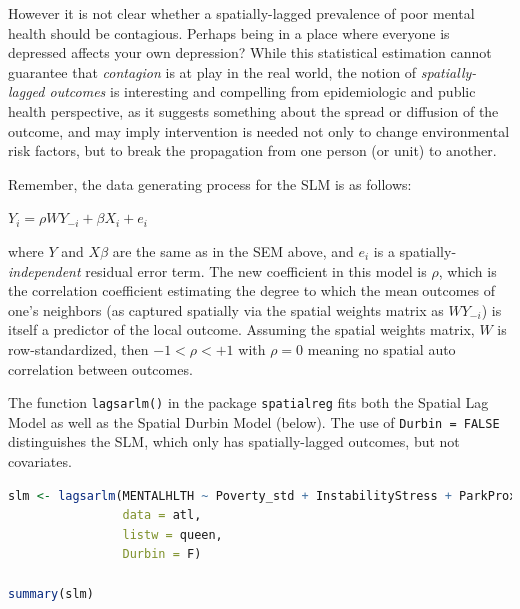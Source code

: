 \documentclass[
]{book}
\newcommand{\passthrough}[1]{#1}
\begin{document}
However it is not clear whether a spatially-lagged prevalence of poor mental health should be contagious. Perhaps being in a place where everyone is depressed affects your own depression? While this statistical estimation cannot guarantee that \emph{contagion} is at play in the real world, the notion of \emph{spatially-lagged outcomes} is interesting and compelling from epidemiologic and public health perspective, as it suggests something about the spread or diffusion of the outcome, and may imply intervention is needed not only to change environmental risk factors, but to break the propagation from one person (or unit) to another.

Remember, the data generating process for the SLM is as follows:

\(Y_i=\rho WY_{-i}+\beta X_i+e_i\)

where \(Y\) and \(X\beta\) are the same as in the SEM above, and \(e_i\) is a spatially-\emph{independent} residual error term. The new coefficient in this model is \(\rho\), which is the correlation coefficient estimating the degree to which the mean outcomes of one's neighbors (as captured spatially via the spatial weights matrix as \(WY_{-i}\)) is itself a predictor of the local outcome. Assuming the spatial weights matrix, \(W\) is row-standardized, then \(-1<\rho<+1\) with \(\rho=0\) meaning no spatial auto correlation between outcomes.

The function \passthrough{\lstinline!lagsarlm()!} in the package \passthrough{\lstinline!spatialreg!} fits both the Spatial Lag Model as well as the Spatial Durbin Model (below). The use of \passthrough{\lstinline!Durbin = FALSE!} distinguishes the SLM, which only has spatially-lagged outcomes, but not covariates.

\begin{lstlisting}[language=R]
slm <- lagsarlm(MENTALHLTH ~ Poverty_std + InstabilityStress + ParkProximity_std  + PHYSHLTH,
                data = atl,
                listw = queen,
                Durbin = F)

summary(slm)
\end{lstlisting}
\end{document}
